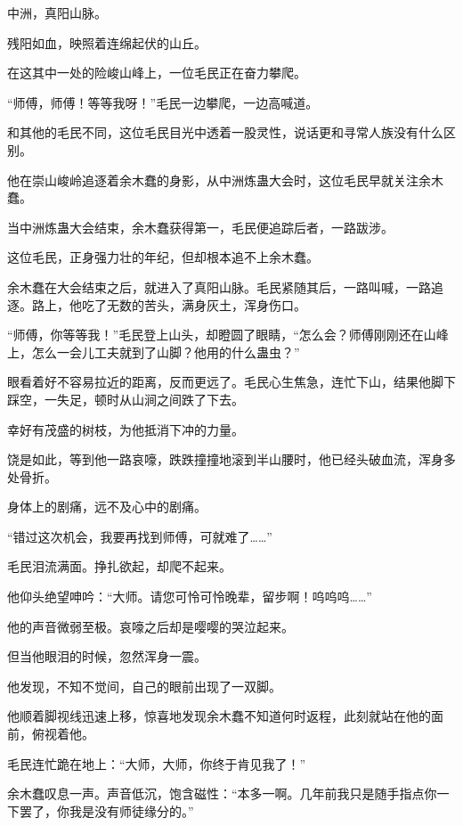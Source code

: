 
\begin{this_body}

中洲，真阳山脉。

残阳如血，映照着连绵起伏的山丘。

在这其中一处的险峻山峰上，一位毛民正在奋力攀爬。

“师傅，师傅！等等我呀！”毛民一边攀爬，一边高喊道。

和其他的毛民不同，这位毛民目光中透着一股灵性，说话更和寻常人族没有什么区别。

他在崇山峻岭追逐着余木蠢的身影，从中洲炼蛊大会时，这位毛民早就关注余木蠢。

当中洲炼蛊大会结束，余木蠢获得第一，毛民便追踪后者，一路跋涉。

这位毛民，正身强力壮的年纪，但却根本追不上余木蠢。

余木蠢在大会结束之后，就进入了真阳山脉。毛民紧随其后，一路叫喊，一路追逐。路上，他吃了无数的苦头，满身灰土，浑身伤口。

“师傅，你等等我！”毛民登上山头，却瞪圆了眼睛，“怎么会？师傅刚刚还在山峰上，怎么一会儿工夫就到了山脚？他用的什么蛊虫？”

眼看着好不容易拉近的距离，反而更远了。毛民心生焦急，连忙下山，结果他脚下踩空，一失足，顿时从山涧之间跌了下去。

幸好有茂盛的树枝，为他抵消下冲的力量。

饶是如此，等到他一路哀嚎，跌跌撞撞地滚到半山腰时，他已经头破血流，浑身多处骨折。

身体上的剧痛，远不及心中的剧痛。

“错过这次机会，我要再找到师傅，可就难了……”

毛民泪流满面。挣扎欲起，却爬不起来。

他仰头绝望呻吟：“大师。请您可怜可怜晚辈，留步啊！呜呜呜……”

他的声音微弱至极。哀嚎之后却是嘤嘤的哭泣起来。

但当他眼泪的时候，忽然浑身一震。

他发现，不知不觉间，自己的眼前出现了一双脚。

他顺着脚视线迅速上移，惊喜地发现余木蠢不知道何时返程，此刻就站在他的面前，俯视着他。

毛民连忙跪在地上：“大师，大师，你终于肯见我了！”

余木蠢叹息一声。声音低沉，饱含磁性：“本多一啊。几年前我只是随手指点你一下罢了，你我是没有师徒缘分的。”


\end{this_body}
